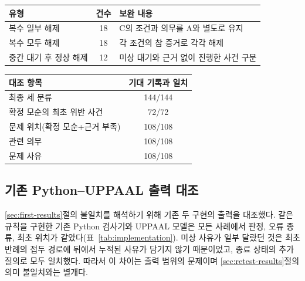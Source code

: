\begin{revision}
\begin{table}[t]
\centering
\color{revisionblue}
\label{tab:failures}
\scriptsize
\begin{tabularx}{\columnwidth}{L{.36\columnwidth}cY}
\toprule
유형 & 건수 & 보완 내용 \\
\midrule
복수 일부 해제 & 18 & C의 조건과 의무를 A와 별도로 유지 \\
복수 모두 해제 & 18 & 각 조건의 참 증거로 각각 해제 \\
중간 대기 후 정상 해제 & 12 & 미상 대기와 근거 없이 진행한 사건 구분 \\
\bottomrule
\end{tabularx}
\end{table}

\begin{table}[t]
\centering
\color{revisionblue}
\label{tab:retest}
\footnotesize
\begin{tabularx}{\columnwidth}{Yc}
\toprule
대조 항목 & 기대 기록과 일치 \\
\midrule
최종 세 분류 & 144/144 \\
확정 모순의 최초 위반 사건 & 72/72 \\
문제 위치(확정 모순+근거 부족) & 108/108 \\
관련 의무 & 108/108 \\
문제 사유 & 108/108 \\
\bottomrule
\end{tabularx}
\end{table}

\subsection{기존 Python--UPPAAL 출력 대조}
\label{sec:agreement-results}
\ref{sec:first-results}절의 불일치를 해석하기 위해 기존 두 구현의 출력을 대조했다. 같은 규칙을 구현한 기존 Python 검사기와 UPPAAL 모델은 모든 사례에서 판정, 오류 종류, 최초 위치가 같았다(표~\ref{tab:implementation}). 미상 사유가 일부 달랐던 것은 최초 반례의 접두 경로에 뒤에서 누적된 사유가 담기지 않기 때문이었고, 종료 상태의 추가 질의로 모두 일치했다. 따라서 이 차이는 출력 범위의 문제이며 \ref{sec:retest-results}절의 의미 불일치와는 별개다.


\end{revision}
